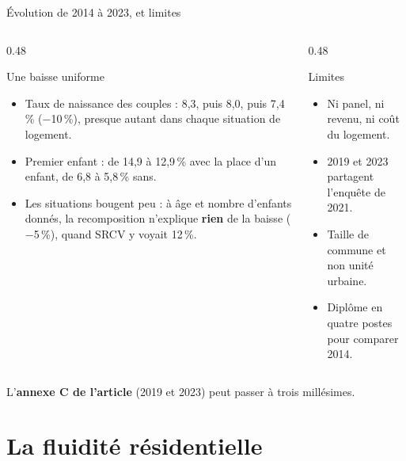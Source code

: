 \documentclass[10pt,aspectratio=169]{beamer}
\begin{document}
\begin{frame}{Évolution de 2014 à 2023, et limites}
  \begin{columns}[T]
    \begin{column}{0.48\textwidth}
      \begin{callout}[tdtenavy]{Une baisse uniforme}
        \begin{itemize}\setlength{\itemsep}{2pt}
          \item Taux de naissance des couples : 8,3, puis 8,0, puis 7,4\,\% ($-$10\,\%), presque autant dans chaque situation de logement.
          \item Premier enfant : de 14,9 à 12,9\,\% avec la place d'un enfant, de 6,8 à 5,8\,\% sans.
          \item Les situations bougent peu : à âge et nombre d'enfants donnés, la recomposition n'explique \textbf{rien} de la baisse ($-$5\,\%), quand SRCV y voyait 12\,\%.
        \end{itemize}
      \end{callout}
    \end{column}
    \begin{column}{0.48\textwidth}
      \begin{callout}[tdtered]{Limites}
        \begin{itemize}\setlength{\itemsep}{2pt}
          \item Ni panel, ni revenu, ni coût du logement.
          \item 2019 et 2023 partagent l'enquête de 2021.
          \item Taille de commune et non unité urbaine.
          \item Diplôme en quatre postes pour comparer 2014.
        \end{itemize}
      \end{callout}
    \end{column}
  \end{columns}
  \vspace{0.15cm}
  \small L'\textbf{annexe C de l'article} (2019 et 2023) peut passer à trois millésimes.
\end{frame}

\section{La fluidité résidentielle}
\end{document}
